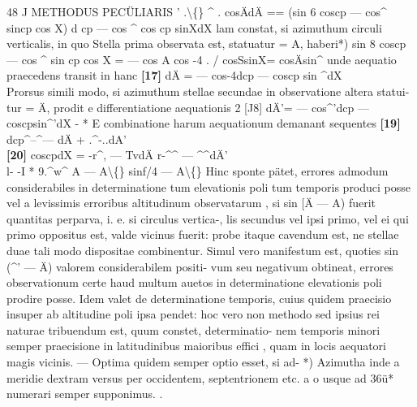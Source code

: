 \documentclass[12pt,a4paper]{article}
\begin{document}
48  J  METHODUS  PECÜLIARIS  '  .\textbackslash\{\}         \^{}     .       
cosÄdÄ  ==  (sin  6  coscp  ---  cos\^{}  sincp  cos X) d cp  ---  cos  \^{}  cos cp  sinXdX
lam  constat,  si  azimuthum  circuli  verticalis,  in  quo  Stella  prima  observata  est,
statuatur   =  A,   haberi*)
sin 8  coscp  ---  cos \^{}  sin cp  cos X  =  --- cos A  cos -4    .       /
cosSsinX=       cosÄsin\^{}
unde  aequatio  praecedens  transit  in  hanc
\noindent \textbf{[17]} dÄ  =  --- cos-4dcp  ---  coscp  sin \^{}dX\\
Prorsus  simili  modo,  si  azimuthum  stellae  secundae  in  observatione  altera  statui-
tur    =  Ä,    prodit  e  differentiatione  aequationis  2
[J8]  dÄ'= --- cos\^{}'dcp  ---  coscpsin\^{}'dX  -    *
E  combinatione  harum  aequationum  demanant  sequentes
\noindent \textbf{[19]} dcp\^{}--\^{}--- dÄ  +  .\^{}-..dA'\\
\noindent \textbf{[20]} coscpdX  =       -r\^{}, --- TvdÄ   r-\^{}\^{} --- \^{}\^{}dÄ'\\
l-         -I  *  9.\^{}w\^{}  A  ---  A\textbackslash\{\}  sinf/4  ---  A\textbackslash\{\}
Hinc  sponte  pätet,  errores  admodum  considerabiles  in  determinatione  tum
elevationis  poli  tum  temporis  produci  posse  vel  a  levissimis  erroribus  altitudinum
observatarum ,  si  sin  [Ä ---  A)  fuerit  quantitas  perparva,  i.  e.  si  circulus  vertica-,
lis  secundus  vel  ipsi  primo,  vel  ei  qui  primo  oppositus  est,  valde  vicinus  fuerit:
probe  itaque  cavendum  est,  ne  stellae  duae  tali  modo  dispositae  combinentur.
Simul  vero  manifestum  est,  quoties  sin  (\^{}' --- Ä)  valorem  considerabilem  positi-
vum  seu  negativum  obtineat,  errores  observationum  certe  haud  multum  auetos
in  determinatione  elevationis  poli  prodire  posse.  Idem  valet  de  determinatione
temporis,  cuius  quidem  praecisio  insuper  ab  altitudine  poli  ipsa  pendet:  hoc  vero
non  methodo  sed  ipsius  rei  naturae  tribuendum  est,  quum  constet,  determinatio-
nem  temporis  minori  semper  praecisione  in  latitudinibus  maioribus  effici ,  quam
in  locis  aequatori  magis  vicinis.  ---     Optima  quidem  semper  optio  esset,   si  ad-
*)  Azimutha  inde  a  meridie  dextram  versus  per  occidentem,  septentrionem  etc.  a  o  usque  ad    36ü*
numerari  semper  supponimus.  .

\newpage
\end{document}
